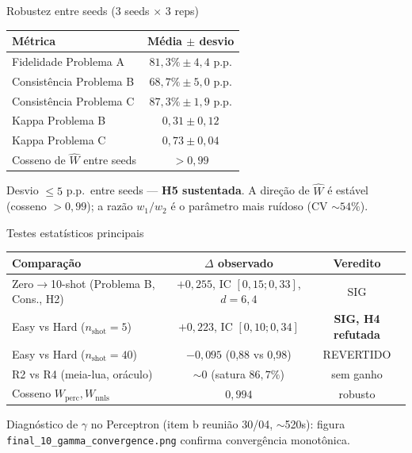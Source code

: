 \documentclass[aspectratio=169,10pt]{beamer}
\begin{document}
\begin{frame}{Robustez entre seeds (3 seeds $\times$ 3 reps)}
  \scriptsize
  \begin{center}
  \begin{tabular}{lc}
    \toprule
    M\'etrica & M\'edia $\pm$ desvio \\
    \midrule
    Fidelidade Problema A        & $81{,}3\% \pm 4{,}4$ p.p. \\
    Consist\^encia Problema B    & $68{,}7\% \pm 5{,}0$ p.p. \\
    Consist\^encia Problema C    & $87{,}3\% \pm 1{,}9$ p.p. \\
    Kappa Problema B             & $0{,}31 \pm 0{,}12$ \\
    Kappa Problema C             & $0{,}73 \pm 0{,}04$ \\
    Cosseno de $\hat W$ entre seeds & $> 0{,}99$ \\
    \bottomrule
  \end{tabular}
  \end{center}
  \medskip
  Desvio $\leq 5$ p.p.\ entre seeds --- \textbf{H5 sustentada}. A dire\c{c}\~ao de $\hat W$ \'e est\'avel (cosseno $>0{,}99$); a raz\~ao $w_1/w_2$ \'e o par\^ametro mais ru\'idoso (CV $\sim 54\%$).
\end{frame}

\begin{frame}{Testes estat\'isticos principais}
  \scriptsize
  \begin{center}
  \begin{tabular}{lcc}
    \toprule
    Compara\c{c}\~ao & $\Delta$ observado & Veredito \\
    \midrule
    Zero$\to$10-shot (Problema B, Cons., H2) & $+0{,}255$, IC $[0{,}15;0{,}33]$, $d{=}6{,}4$ & SIG \\
    Easy vs Hard ($n_{\text{shot}}=5$)    & $+0{,}223$, IC $[0{,}10;0{,}34]$  & \textbf{SIG, H4 refutada} \\
    Easy vs Hard ($n_{\text{shot}}=40$)   & $-0{,}095$ (0,88 vs 0,98)      & REVERTIDO \\
    R2 vs R4 (meia-lua, or\'aculo)         & $\sim 0$ (satura $86{,}7\%$)    & sem ganho \\
    Cosseno $W_{\text{perc}}, W_{\text{nnls}}$ & $0{,}994$                  & robusto \\
    \bottomrule
  \end{tabular}
  \end{center}
  \medskip
  Diagn\'ostico de $\gamma$ no Perceptron (item b reuni\~ao 30/04, $\sim$520s): figura \texttt{final\_10\_gamma\_convergence.png} confirma converg\^encia monot\^onica.
\end{frame}
\end{document}
